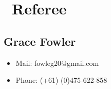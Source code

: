 \documentclass{resume}
\begin{document}
\section{\faInfo\ Referee}
\subsection{\textbf{Grace Fowler}}
\begin{itemize}
  \item Mail: fowleg20@gmail.com
  \item Phone: (+61) (0)475-622-858
\end{itemize}

%
%
\end{document}
